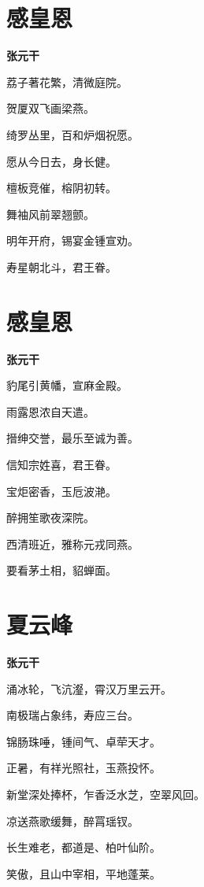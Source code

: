 \documentclass[12pt,a4paper]{ctexbook}
\begin{document}
\section{感皇恩}
\textbf{张元干}\par\vspace{0.5em}
荔子著花繁，清微庭院。\par
贺厦双飞画梁燕。\par
绮罗丛里，百和炉烟祝愿。\par
愿从今日去，身长健。\par
檀板竞催，榕阴初转。\par
舞袖风前翠翘颤。\par
明年开府，锡宴金锺宣劝。\par
寿星朝北斗，君王眷。\par

\section{感皇恩}
\textbf{张元干}\par\vspace{0.5em}
豹尾引黄幡，宣麻金殿。\par
雨露恩浓自天遣。\par
搢绅交誉，最乐至诚为善。\par
信知宗姓喜，君王眷。\par
宝炬密香，玉卮波滟。\par
醉拥笙歌夜深院。\par
西清班近，雅称元戎同燕。\par
要看茅土相，貂蝉面。\par

\section{夏云峰}
\textbf{张元干}\par\vspace{0.5em}
涌冰轮，飞沆瀣，霄汉万里云开。\par
南极瑞占象纬，寿应三台。\par
锦肠珠唾，锺间气、卓荦天才。\par
正暑，有祥光照社，玉燕投怀。\par
新堂深处捧杯，乍香泛水芝，空翠风回。\par
凉送燕歌缓舞，醉罥瑶钗。\par
长生难老，都道是、柏叶仙阶。\par
笑傲，且山中宰相，平地蓬莱。\par
\end{document}
